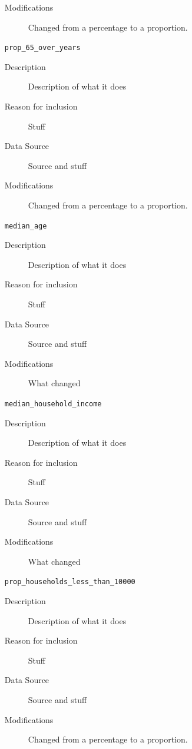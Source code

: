 \documentclass{article}
\begin{document}
\begin{itemize}[label={}, align=left]
\begin{description}
              \item[Modifications] Changed from a percentage to a proportion.
          \end{description}
    \item[\texttt{prop\_65\_over\_years}] \
          \begin{description}
              \item[Description] Description of what it does
              \item[Reason for inclusion] Stuff
              \item[Data Source] Source and stuff
              \item[Modifications] Changed from a percentage to a proportion.
          \end{description}
    \item[\texttt{median\_age}] \
          \begin{description}
              \item[Description] Description of what it does
              \item[Reason for inclusion] Stuff
              \item[Data Source] Source and stuff
              \item[Modifications] What changed
          \end{description}
    \item[\texttt{median\_household\_income}] \
          \begin{description}
              \item[Description] Description of what it does
              \item[Reason for inclusion] Stuff
              \item[Data Source] Source and stuff
              \item[Modifications] What changed
          \end{description}
    \item[\texttt{prop\_households\_less\_than\_10000}] \
          \begin{description}
              \item[Description] Description of what it does
              \item[Reason for inclusion] Stuff
              \item[Data Source] Source and stuff
              \item[Modifications] Changed from a percentage to a proportion.
          \end{description}

\end{itemize}
\end{document}
